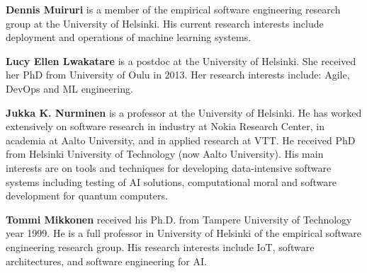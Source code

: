 \textbf{Dennis Muiruri} is a member of the empirical software engineering research group at the University of Helsinki. His current research interests include deployment and operations of machine learning systems.

\textbf{Lucy Ellen Lwakatare} is a postdoc at the University of Helsinki. She received her PhD from University of Oulu in 2013. Her research interests include: Agile, DevOps and ML engineering.

\textbf{Jukka K. Nurminen} is a professor at the University of Helsinki. He has worked extensively on software research in industry at Nokia Research Center, in academia at Aalto University, and in applied research at VTT. He received PhD from Helsinki University of Technology (now Aalto University). His main interests are on tools and techniques for developing data-intensive software systems including testing of AI solutions, computational moral and software development for quantum computers.

\textbf{Tommi Mikkonen} received his Ph.D. from Tampere University of Technology year 1999. He is a full professor in University of Helsinki of the empirical software engineering research group. His research interests include IoT, software architectures, and software engineering for AI.
